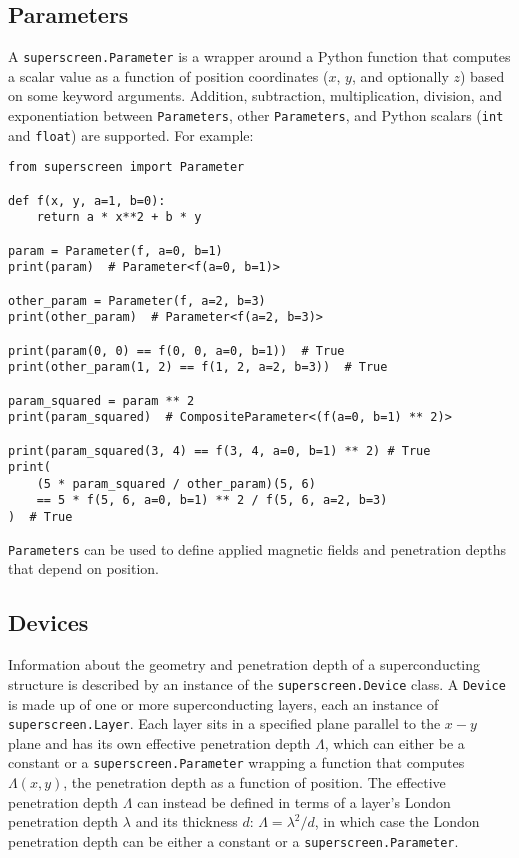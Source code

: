 \documentclass{article}
\begin{document}
\subsection{Parameters}
\label{section:overview:parameter}

A \texttt{superscreen.Parameter} is a wrapper around a Python function that computes a scalar value as a function of position coordinates ($x$, $y$, and optionally $z$) based on some keyword arguments. Addition, subtraction, multiplication, division, and exponentiation between \texttt{Parameters}, other \texttt{Parameters}, and Python scalars (\texttt{int} and \texttt{float}) are supported. For example:

\begin{verbatim}
from superscreen import Parameter

def f(x, y, a=1, b=0):
    return a * x**2 + b * y
    
param = Parameter(f, a=0, b=1)
print(param)  # Parameter<f(a=0, b=1)>

other_param = Parameter(f, a=2, b=3)
print(other_param)  # Parameter<f(a=2, b=3)>

print(param(0, 0) == f(0, 0, a=0, b=1))  # True
print(other_param(1, 2) == f(1, 2, a=2, b=3))  # True

param_squared = param ** 2
print(param_squared)  # CompositeParameter<(f(a=0, b=1) ** 2)>

print(param_squared(3, 4) == f(3, 4, a=0, b=1) ** 2) # True
print(
    (5 * param_squared / other_param)(5, 6)
    == 5 * f(5, 6, a=0, b=1) ** 2 / f(5, 6, a=2, b=3)
)  # True
\end{verbatim}

\texttt{Parameters} can be used to define applied magnetic fields and penetration depths that depend on position.

\subsection{Devices}
\label{section:overview:device}

Information about the geometry and penetration depth of a superconducting structure is described by an instance of the \texttt{superscreen.Device} class. A \texttt{Device} is made up of one or more superconducting layers, each an instance of  \texttt{superscreen.Layer}. Each layer sits in a specified plane parallel to the $x-y$ plane and has its own effective penetration depth $\Lambda$, which can either be a constant or a \texttt{superscreen.Parameter} wrapping a function that computes $\Lambda(x, y)$, the penetration depth as a function of position. The effective penetration depth $\Lambda$ can instead be defined in terms of a layer's London penetration depth $\lambda$ and its thickness $d$: $\Lambda=\lambda^2/d$, in which case the London penetration depth can be either a constant or a \texttt{superscreen.Parameter}.
\end{document}
